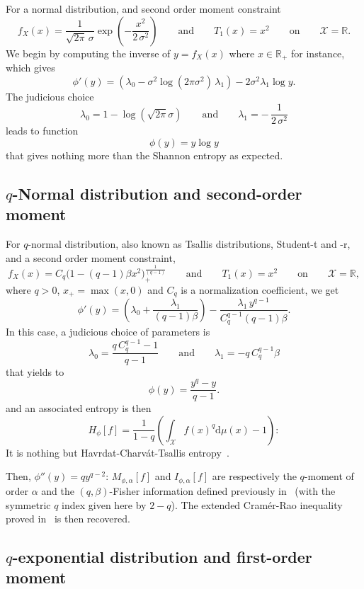 \documentclass[english,sort&compress]{elsarticle}
\theoremstyle{definition}
\theoremstyle{plain}
\theoremstyle{plain}
\def\dmu{\mathrm{d}\mu}
\def\Rset{\mathbb{R}}
\def\X{\mathcal{X}}
\begin{document}
For a normal distribution, and second order moment constraint 
%
\[
f_X(x)  = \frac{1}{\sqrt{2\pi} \,\sigma}  \exp\left( -\frac{x^2}{2  \, \sigma^2}
\right)  \qquad \mbox{and}  \qquad T_1(x)  = x^2  \qquad \mbox{on}  \qquad  \X =
\Rset.
\]
%
We begin  by computing the  inverse of  $y = f_X(x)$  where $x \in  \Rset_+$ for
instance, which gives
%
\[
\phi'(y) = \left( \lambda_0 - \sigma^2 \log(2 \pi \sigma^2) \, \lambda_1 \right)
- 2 \sigma^2 \lambda_1 \log y.
\]
%
The judicious choice
%
\[
\lambda_0 = 1 - \log( \sqrt{2\pi}  \sigma ) \qquad \mbox{and} \qquad \lambda_1 =
- \, \frac{1}{2 \, \sigma^2}
\]
%
leads to function
%
\[
\phi(y) = y \log y
\]
%
that gives nothing more than the Shannon entropy as expected.



\subsection{$q$-Normal distribution and second-order moment}
\label{subsec:qNormalSecondOrder}

For $q$-normal distribution, also  known as Tsallis distributions, Student-t and
-r, and a second order moment constraint,
%
\[
f_X(x)  = C_q  \Big( 1  - (q-1)  \beta x^2  \Big)_{\!+}^{\frac{1}{(q-1)}} \qquad
\mbox{and} \qquad T_1(x) = x^2 \qquad \mbox{on} \qquad \X = \Rset,
\]
%
where $q  > 0$, $x_+ = \max(x,0)$  and $C_q$ is a  normalization coefficient, we
get
%
\[
\phi'(y)  =   \left(  \lambda_0   +  \frac{\lambda_1}{(q-1)  \beta}   \right)  -
\frac{\lambda_1 \, y^{q-1}}{C_q^{q-1} (q-1) \beta}.
\]
%
In this case, a judicious choice of parameters is
%
\[
\lambda_0 = \frac{q \, C_q^{q-1}  - 1}{q-1} \qquad \mbox{and} \qquad \lambda_1 =
-q \, C_q^{q-1} \beta
\]
%
that yields to 
%
\[
\phi(y) = \frac{y^q-y}{q-1}.
\]
%
and an associated entropy is then 
%
\[
H_\phi[f] = \frac{1}{1-q} \left( \int_\X f(x)^q \dmu(x) - 1 \right):
\]
%
It  is  nothing  but  Havrdat-Charv\'at-Tsallis  entropy~\cite{HavCha67,  Dar70,
  Tsa88, CosHer03}.

Then, $\phi''(y) = q y^{q-2}$: $M_{\phi,\alpha}[f]$ and $I_{\phi,\alpha}[f]$ are
respectively  the  $q$-moment  of  order  $\alpha$  and  the  $(q,\beta)$-Fisher
information defined previously in~\cite{Ber12:06_1, Ber12:06_2, Ber13} (with the
symmetric $q$ index  given here by $2-q$). The  extended Cram\'er-Rao inequality
proved in~\cite{Ber12:06_2, Ber13} is then recovered.



\subsection{$q$-exponential distribution and first-order moment}
\label{subsec:qExponentialFirstOrder}
\end{document}
